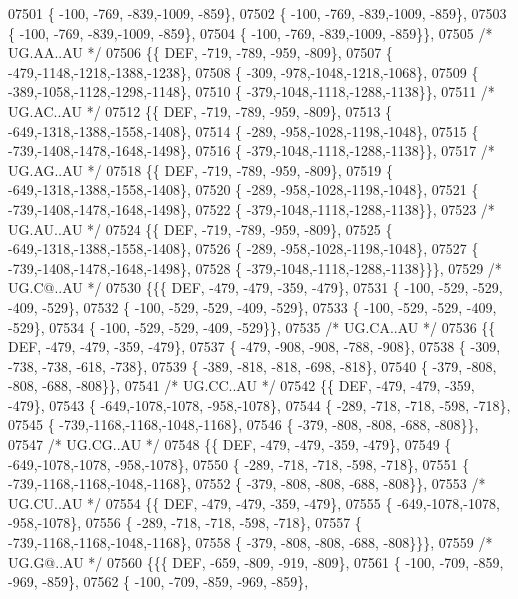 \begin{DoxyCode}
07501 \{ -100, -769, -839,-1009, -859\},
07502 \{ -100, -769, -839,-1009, -859\},
07503 \{ -100, -769, -839,-1009, -859\},
07504 \{ -100, -769, -839,-1009, -859\}\},
07505 \textcolor{comment}{/* UG.AA..AU */}
07506 \{\{  DEF, -719, -789, -959, -809\},
07507 \{ -479,-1148,-1218,-1388,-1238\},
07508 \{ -309, -978,-1048,-1218,-1068\},
07509 \{ -389,-1058,-1128,-1298,-1148\},
07510 \{ -379,-1048,-1118,-1288,-1138\}\},
07511 \textcolor{comment}{/* UG.AC..AU */}
07512 \{\{  DEF, -719, -789, -959, -809\},
07513 \{ -649,-1318,-1388,-1558,-1408\},
07514 \{ -289, -958,-1028,-1198,-1048\},
07515 \{ -739,-1408,-1478,-1648,-1498\},
07516 \{ -379,-1048,-1118,-1288,-1138\}\},
07517 \textcolor{comment}{/* UG.AG..AU */}
07518 \{\{  DEF, -719, -789, -959, -809\},
07519 \{ -649,-1318,-1388,-1558,-1408\},
07520 \{ -289, -958,-1028,-1198,-1048\},
07521 \{ -739,-1408,-1478,-1648,-1498\},
07522 \{ -379,-1048,-1118,-1288,-1138\}\},
07523 \textcolor{comment}{/* UG.AU..AU */}
07524 \{\{  DEF, -719, -789, -959, -809\},
07525 \{ -649,-1318,-1388,-1558,-1408\},
07526 \{ -289, -958,-1028,-1198,-1048\},
07527 \{ -739,-1408,-1478,-1648,-1498\},
07528 \{ -379,-1048,-1118,-1288,-1138\}\}\},
07529 \textcolor{comment}{/* UG.C@..AU */}
07530 \{\{\{  DEF, -479, -479, -359, -479\},
07531 \{ -100, -529, -529, -409, -529\},
07532 \{ -100, -529, -529, -409, -529\},
07533 \{ -100, -529, -529, -409, -529\},
07534 \{ -100, -529, -529, -409, -529\}\},
07535 \textcolor{comment}{/* UG.CA..AU */}
07536 \{\{  DEF, -479, -479, -359, -479\},
07537 \{ -479, -908, -908, -788, -908\},
07538 \{ -309, -738, -738, -618, -738\},
07539 \{ -389, -818, -818, -698, -818\},
07540 \{ -379, -808, -808, -688, -808\}\},
07541 \textcolor{comment}{/* UG.CC..AU */}
07542 \{\{  DEF, -479, -479, -359, -479\},
07543 \{ -649,-1078,-1078, -958,-1078\},
07544 \{ -289, -718, -718, -598, -718\},
07545 \{ -739,-1168,-1168,-1048,-1168\},
07546 \{ -379, -808, -808, -688, -808\}\},
07547 \textcolor{comment}{/* UG.CG..AU */}
07548 \{\{  DEF, -479, -479, -359, -479\},
07549 \{ -649,-1078,-1078, -958,-1078\},
07550 \{ -289, -718, -718, -598, -718\},
07551 \{ -739,-1168,-1168,-1048,-1168\},
07552 \{ -379, -808, -808, -688, -808\}\},
07553 \textcolor{comment}{/* UG.CU..AU */}
07554 \{\{  DEF, -479, -479, -359, -479\},
07555 \{ -649,-1078,-1078, -958,-1078\},
07556 \{ -289, -718, -718, -598, -718\},
07557 \{ -739,-1168,-1168,-1048,-1168\},
07558 \{ -379, -808, -808, -688, -808\}\}\},
07559 \textcolor{comment}{/* UG.G@..AU */}
07560 \{\{\{  DEF, -659, -809, -919, -809\},
07561 \{ -100, -709, -859, -969, -859\},
07562 \{ -100, -709, -859, -969, -859\},

\end{DoxyCode}
